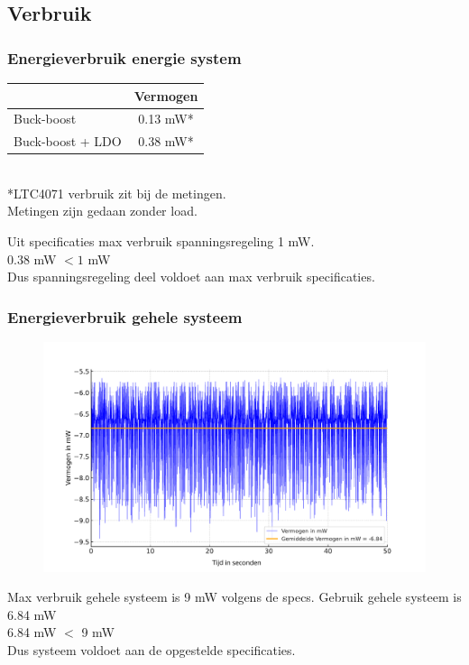     \subsection{Verbruik}
    \begin{frame}
        \frametitle{Energieverbruik energie system}
        \begin{tabular}{|l|c|}
        \hline
            & Vermogen \\ \hline
            Buck-boost & 0.13 mW* \\ \hline
            Buck-boost + LDO  & 0.38 mW*\\ \hline
        \end{tabular} \\       
        *LTC4071 verbruik zit bij de metingen.\\
        Metingen zijn gedaan zonder load.
        \vspace{1cm}

            \centering
            Uit specificaties max verbruik spanningsregeling 1 mW.\\ 
            $0.38$ mW $< 1$ mW\\
            Dus spanningsregeling deel voldoet aan max verbruik specificaties. 

    \end{frame}
    \begin{frame}
        \frametitle{Energieverbruik gehele systeem}
        \begin{figure}[h]
            \centering
            \includegraphics[scale=0.35]{img/vermogensMeting.pdf}
        \end{figure}
        \centering
        Max verbruik gehele systeem is 9 mW volgens de specs.
        Gebruik gehele systeem is 6.84 mW\\
        6.84 mW $<$ 9 mW\\
        Dus systeem voldoet aan de opgestelde specificaties.

    \end{frame}

    
        
    
